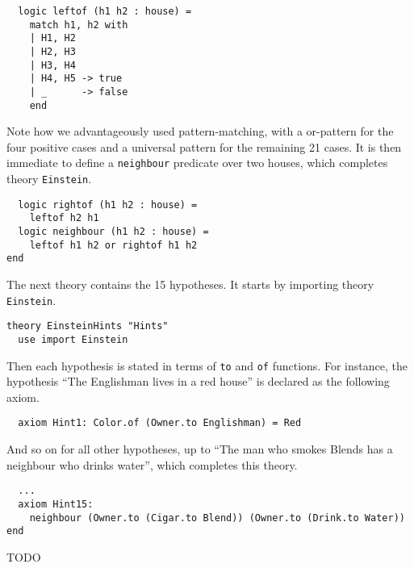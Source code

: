 \begin{verbatim}
  logic leftof (h1 h2 : house) =
    match h1, h2 with
    | H1, H2 
    | H2, H3 
    | H3, H4 
    | H4, H5 -> true
    | _      -> false
    end
\end{verbatim}
Note how we advantageously used pattern-matching, with a or-pattern
for the four positive cases and a universal pattern for the remaining
21 cases. It is then immediate to define a \texttt{neighbour}
predicate over two houses, which completes theory \texttt{Einstein}.
\begin{verbatim}
  logic rightof (h1 h2 : house) =
    leftof h2 h1
  logic neighbour (h1 h2 : house) =
    leftof h1 h2 or rightof h1 h2
end
\end{verbatim}

The next theory contains the 15 hypotheses. It starts by importing
theory \texttt{Einstein}.
\begin{verbatim}
theory EinsteinHints "Hints"
  use import Einstein
\end{verbatim}
Then each hypothesis is stated in terms of \texttt{to} and \texttt{of}
functions. For instance, the hypothesis ``The Englishman lives in a
red house'' is declared as the following axiom.
\begin{verbatim}
  axiom Hint1: Color.of (Owner.to Englishman) = Red
\end{verbatim}
And so on for all other hypotheses, up to
``The man who smokes Blends has a neighbour who drinks water'', which completes
this theory.
\begin{verbatim}
  ...
  axiom Hint15:
    neighbour (Owner.to (Cigar.to Blend)) (Owner.to (Drink.to Water))
end
\end{verbatim}

TODO


